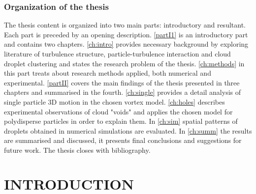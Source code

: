 \section{Organization of the thesis}
The thesis content is organized into two main parts: introductory and resultant. Each part is preceded by an opening description. \autoref{partI1} is an introductory part and contains two chapters. \autoref{ch:intro} provides necessary background by exploring literature of turbulence structure, particle-turbulence interaction and cloud droplet clustering and states the research problem of the thesis. \autoref{ch:methods} in this part treats about research methods applied, both numerical and experimental. \autoref{partII} covers the main findings of the thesis presented in three chapters and summarised in the fourth. \autoref{ch:single} provides a detail analysis of single particle 3D motion in the chosen vortex model. \autoref{ch:holes} describes experimental observations of cloud "voids" and applies the chosen model for polydisperse particles in order to explain them. In \autoref{ch:sim} spatial patterns of droplets obtained in numerical simulations are evaluated. In \autoref{ch:summ} the results are summarised and discussed, it presents final conclusions and suggestions for future work. The thesis closes with bibliography.\\

%
%

\part{INTRODUCTION} %
\label{partI1}

